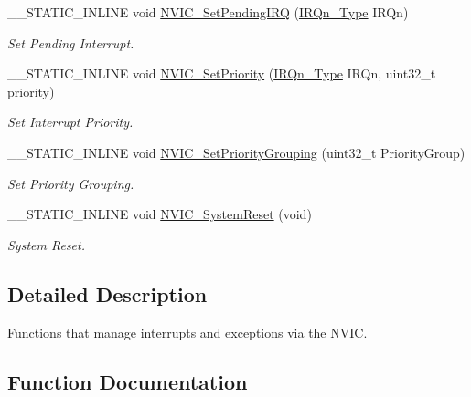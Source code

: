 \begin{DoxyCompactItemize}
\+\_\+\+\_\+\+S\+T\+A\+T\+I\+C\+\_\+\+I\+N\+L\+I\+NE void \hyperlink{group__CMSIS__Core__NVICFunctions_ga3ecf446519da33e1690deffbf5be505f}{N\+V\+I\+C\+\_\+\+Set\+Pending\+I\+RQ} (\hyperlink{group__CMSIS__175X__6X__IRQ_gaaaeafe7bd8401a46d55e8431b6326116}{I\+R\+Qn\+\_\+\+Type} I\+R\+Qn)
\begin{DoxyCompactList}\small\item\em Set Pending Interrupt. \end{DoxyCompactList}\item 
\+\_\+\+\_\+\+S\+T\+A\+T\+I\+C\+\_\+\+I\+N\+L\+I\+NE void \hyperlink{group__CMSIS__Core__NVICFunctions_ga2305cbd44aaad792e3a4e538bdaf14f9}{N\+V\+I\+C\+\_\+\+Set\+Priority} (\hyperlink{group__CMSIS__175X__6X__IRQ_gaaaeafe7bd8401a46d55e8431b6326116}{I\+R\+Qn\+\_\+\+Type} I\+R\+Qn, uint32\+\_\+t priority)
\begin{DoxyCompactList}\small\item\em Set Interrupt Priority. \end{DoxyCompactList}\item 
\+\_\+\+\_\+\+S\+T\+A\+T\+I\+C\+\_\+\+I\+N\+L\+I\+NE void \hyperlink{group__CMSIS__Core__NVICFunctions_ga77cfbb35a9d8027e392034321bed6904}{N\+V\+I\+C\+\_\+\+Set\+Priority\+Grouping} (uint32\+\_\+t Priority\+Group)
\begin{DoxyCompactList}\small\item\em Set Priority Grouping. \end{DoxyCompactList}\item 
\+\_\+\+\_\+\+S\+T\+A\+T\+I\+C\+\_\+\+I\+N\+L\+I\+NE void \hyperlink{group__CMSIS__Core__NVICFunctions_ga1143dec48d60a3d6f238c4798a87759c}{N\+V\+I\+C\+\_\+\+System\+Reset} (void)
\begin{DoxyCompactList}\small\item\em System Reset. \end{DoxyCompactList}\end{DoxyCompactItemize}


\subsection{Detailed Description}
Functions that manage interrupts and exceptions via the N\+V\+IC. 



\subsection{Function Documentation}
